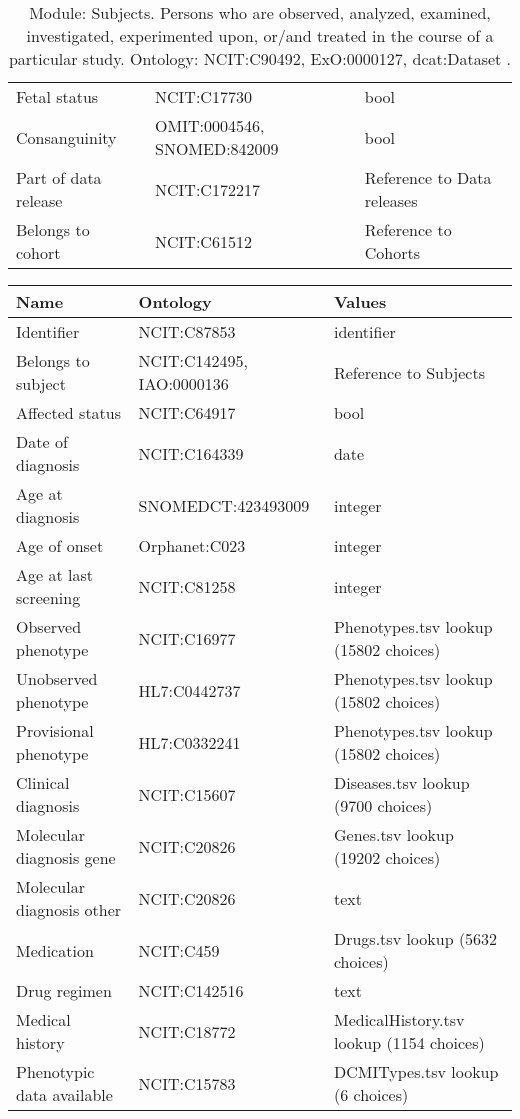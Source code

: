\documentclass{article}
\begin{document}
\begin{table}[htb]
\begin{tabular}{lll}
Fetal status & NCIT:C17730  & bool \\
Consanguinity & OMIT:0004546, SNOMED:842009  & bool \\
Part of data release & NCIT:C172217  & Reference to Data releases \\
Belongs to cohort & NCIT:C61512  & Reference to Cohorts \\
\hline
\end{tabular}
\caption[Module: Subjects]{\label{table:table5} Module: Subjects. Persons who are observed, analyzed, examined, investigated, experimented upon, or/and treated in the course of a particular study. Ontology: NCIT:C90492, ExO:0000127, dcat:Dataset . }
\end{table}

\begin{table}[htb]
\begin{tabular}{lll}
Name & Ontology & Values \\
\hline
Identifier & NCIT:C87853  & identifier \\
Belongs to subject & NCIT:C142495, IAO:0000136  & Reference to Subjects \\
Affected status & NCIT:C64917  & bool \\
Date of diagnosis & NCIT:C164339  & date \\
Age at diagnosis & SNOMEDCT:423493009  & integer \\
Age of onset & Orphanet:C023  & integer \\
Age at last screening & NCIT:C81258  & integer \\
Observed phenotype & NCIT:C16977  & Phenotypes.tsv lookup (15802 choices) \\
Unobserved phenotype & HL7:C0442737  & Phenotypes.tsv lookup (15802 choices) \\
Provisional phenotype & HL7:C0332241  & Phenotypes.tsv lookup (15802 choices) \\
Clinical diagnosis & NCIT:C15607  & Diseases.tsv lookup (9700 choices) \\
Molecular diagnosis gene & NCIT:C20826  & Genes.tsv lookup (19202 choices) \\
Molecular diagnosis other & NCIT:C20826  & text \\
Medication & NCIT:C459  & Drugs.tsv lookup (5632 choices) \\
Drug regimen & NCIT:C142516  & text \\
Medical history & NCIT:C18772  & MedicalHistory.tsv lookup (1154 choices) \\
Phenotypic data available & NCIT:C15783  & DCMITypes.tsv lookup (6 choices) \\

\end{tabular}
\end{table}
\end{document}
